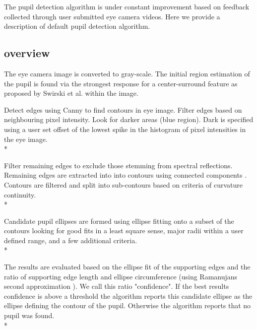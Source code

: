 \documentclass[12pt,fleqn]{book} %
\begin{document}
The pupil detection algorithm is under constant improvement based on feedback collected through user submitted eye camera videos. Here we provide a description of default pupil detection algorithm.
\bigskip

\subsection{overview} 
The eye camera image is converted to gray-scale. The initial region estimation of the pupil is found via the strongest response for a center-surround feature as proposed by Swirski et al. \cite{Swirski} within the image. \newline  %

Detect edges using Canny \cite{Canny} to find contours in eye image. Filter edges based on neighbouring pixel intensity. Look for darker areas (blue region). Dark is specified using a user set offset of the lowest spike in the histogram of pixel intensities in the eye image. \\*

Filter remaining edges to exclude those stemming from spectral reflections. Remaining edges are extracted into into contours using connected components \cite{Suzuki}. Contours are filtered and split into sub-contours based on criteria of curvature continuity. \\*

Candidate pupil ellipses are formed using ellipse fitting \cite{Fitzgibbon} onto a subset of the contours looking for good fits in a least square sense, major radii within a user defined range, and a few additional criteria. \\* 

The results are evaluated based on the ellipse fit of the supporting edges and the ratio of supporting edge length and ellipse circumference (using Ramanujans second approximation \cite{Ramanujans} ). We call this ratio "confidence". If the best results confidence is above a threshold the algorithm reports this candidate ellipse as the ellipse defining the contour of the pupil. Otherwise the algorithm reports that no pupil was found.\\*
\end{document}
